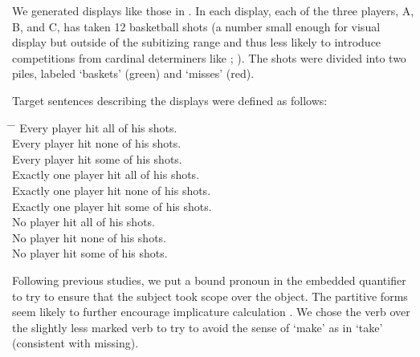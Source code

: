 \documentclass[leqno,12pt]{article}
\begin{document}
We generated displays like those in . In each
display, each of the three players, A, B, and C, has taken 12 basketball shots (a number
small enough for visual display but outside of the subitizing range
and thus less likely to introduce competitions from cardinal
determiners like ;
\citealt{Degen:Tanenhaus:2014}). The shots were divided into two
piles, labeled `baskets' (green) and `misses' (red). 

Target sentences describing the displays were defined as follows:
%
\begin{examples}
\item\label{expmsgs} 
  \begin{tabbing}    
    \phantom{Exactly one} \= \phantom{player hit some} \= \kill
    Every \> player hit  all \> of his shots.\\
    Every \> player hit none \> of his shots.\\
    Every \> player hit some \> of his shots.\\    
    Exactly one \> player hit all \> of his shots.\\
    Exactly one \> player hit none \> of his shots.\\
    Exactly one \> player hit some \> of his shots.\\
    No \> player hit all \> of his shots.\\
    No \> player hit none \> of his shots.\\
    No \> player hit some \> of his shots.
  \end{tabbing}
\end{examples}
%
Following previous studies, we put a bound pronoun in the embedded
quantifier to try to ensure that the subject took scope over the
object. The partitive forms seem likely to further encourage
implicature calculation \citep{Grodner-etal:2010}. We chose the verb
 over the slightly less marked verb  to try to
avoid the sense of `make' as in `take' (consistent with missing).
\end{document}
